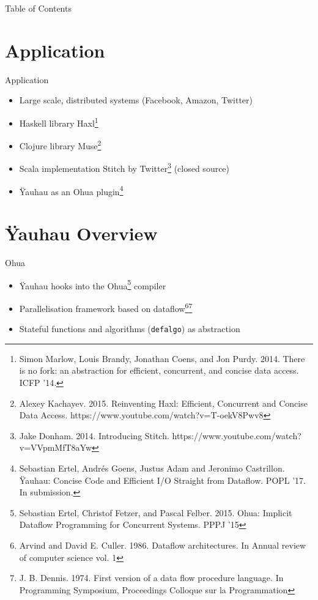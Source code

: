 \documentclass[utf8x,10pt,aspectratio=169]{beamer}
\begin{document}
\begin{frame}{Table of Contents}	
	\tableofcontents
\end{frame}

\section{Application}

\begin{frame}{Application}
	\begin{itemize}
		\item Large scale, distributed systems (Facebook, Amazon, Twitter)
		\item Haskell library Haxl\footnote{Simon Marlow, Louis Brandy, Jonathan Coens, and Jon Purdy. 2014. There is no fork: an abstraction for efficient, concurrent, and concise data access. ICFP '14.}
		\item Clojure library Muse\footnote{Alexey Kachayev. 2015. Reinventing Haxl: Efficient, Concurrent and Concise Data Access. https://www.youtube.com/watch?v=T-oekV8Pwv8}
		\item Scala implementation Stitch by Twitter\footnote{Jake Donham. 2014. Introducing Stitch. https://www.youtube.com/watch?v=VVpmMfT8aYw} (closed source)
		\item Ÿauhau as an Ohua plugin\footnote{Sebastian Ertel, Andrés Goens, Justus Adam and Jeronimo Castrillon. Ÿauhau: Concise Code and Efficient I/O Straight from Dataflow. POPL '17. In submission.}
	\end{itemize}
\end{frame}

\section{Ÿauhau Overview}

\begin{frame}{Ohua}
	\begin{itemize}[<+->]
		\item Ÿauhau hooks into the Ohua\footnote{Sebastian Ertel, Christof Fetzer, and Pascal Felber. 2015. Ohua: Implicit Dataflow Programming for Concurrent Systems. PPPJ '15} compiler
		\item Parallelisation framework based on dataflow\footnote{Arvind and David E. Culler. 1986. Dataflow architectures. In Annual review of computer science vol. 1}\footnote{J. B. Dennis. 1974. First version of a data flow procedure language. In Programming Symposium, Proceedings Colloque sur la Programmation}
		\item Stateful functions and algorithms (\texttt{defalgo}) as abstraction
	\end{itemize}
\end{frame}
\end{document}
